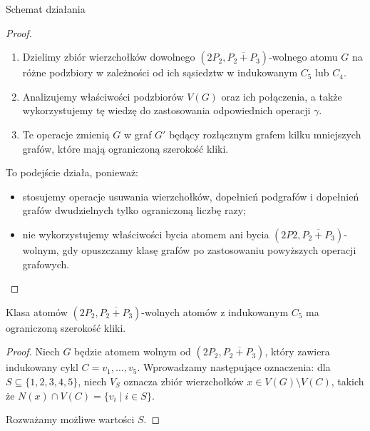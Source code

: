 \documentclass[polish]{beamer}
\begin{document}
\begin{frame}{Schemat działania}
    \begin{proof}
        \renewcommand{\qedsymbol}{}
        \begin{enumerate}
            \item Dzielimy zbiór wierzchołków dowolnego $(2P_2, \overline{P_2 + P_3})$-wolnego atomu $G$ na różne podzbiory w zależności od ich sąsiedztw w indukowanym $C_5$ lub $C_4$. 
            \item Analizujemy właściwości podzbiorów $V(G)$ oraz ich połączenia, a także wykorzystujemy tę wiedzę do zastosowania odpowiednich operacji $\gamma$.
            \item Te operacje zmienią $G$ w graf $G'$ będący rozłącznym grafem kilku mniejszych grafów, które mają ograniczoną szerokość kliki.
        \end{enumerate}

        To podejście działa, ponieważ:
        \begin{itemize}
            \item stosujemy operacje usuwania wierzchołków, dopełnień podgrafów i dopełnień grafów dwudzielnych tylko ograniczoną liczbę razy;
            \item nie wykorzystujemy właściwości bycia atomem ani bycia $(2P2, \overline{P_2 + P_3})$-wolnym, gdy opuszczamy klasę grafów po zastosowaniu powyższych operacji grafowych.
        \end{itemize}
    \end{proof}
\end{frame}


\begin{frame}
    \begin{lemma}
        Klasa atomów $(2P_2, \overline{P_2 + P_3})$-wolnych atomów z indukowanym $C_5$ ma ograniczoną szerokość kliki.
    \end{lemma}
    \begin{proof}
        \renewcommand{\qedsymbol}{}
        Niech $G$ będzie atomem wolnym od $(2P_2, \overline{P_2 + P_3})$, który zawiera indukowany cykl $C = v_1, \dots, v_5$. Wprowadzamy następujące oznaczenia: dla $S \subseteq \{1, 2, 3, 4, 5\}$, niech $V_S$ oznacza zbiór wierzchołków $x \in V(G) \setminus V(C)$, takich że $N(x) \cap V(C) = \{v_i \mid i \in S\}$.
        
        Rozważamy możliwe wartości $S$.
    \end{proof}
\end{frame}
\end{document}
